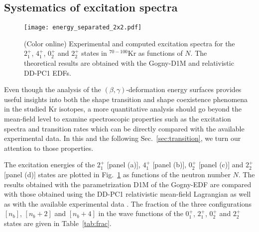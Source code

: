 \documentclass[twocolumn,showpacs,amsmath,amssymb,superscriptaddress]{revtex4-1}
\begin{document}
\subsection{Systematics of excitation spectra\label{sec:energy}}


\begin{figure}[htb!]
\begin{center}
\texttt{[image: energy\_separated\_2x2.pdf]}
\caption{(Color online) Experimental
 \cite{data,albers2013,rzkacaurban2017,dudouet2017,flavigny2017} and computed excitation
 spectra for 
 the $2^+_1$, $4^+_1$, $0^+_2$ and $2^+_2$ states in  $^{70-100}$Kr
 as functions of $N$. The theoretical results are obtained with the Gogny-D1M and
 relativistic DD-PC1 EDFs.}
\label{fig:energy}
\end{center}
\end{figure}


Even though the analysis of the $(\beta,\gamma)$-deformation energy
surfaces provides useful insights into both the shape transition
and shape coexistence phenomena in the studied Kr isotopes, a more 
quantitative analysis should go beyond 
the mean-field level to examine  spectroscopic 
properties such as the  excitation spectra and transition rates which 
can be directly compared with the available 
experimental data. In this and the following Sec.~\ref{sec:transition}, we turn our 
attention to those properties.


The excitation energies of the 
$2^+_1$ [panel (a)], $4^+_1$ [panel (b)], $0^+_2$ [panel (c)] and
$2^+_2$ [panel (d)] states
are plotted in Fig.~\ref{fig:energy} as functions of the neutron number $N$.
The results obtained with the parametrization D1M of the Gogny-EDF
are compared with those obtained using the 
DD-PC1 relativistic mean-field Lagrangian as well as with the available
experimental data \cite{data,albers2013,rzkacaurban2017,dudouet2017,flavigny2017}. The  
fraction of the three
configurations $[n_b]$, $[n_b+2]$ and $[n_b+4]$ 
in the wave functions of the $0^+_1$, $2^+_1$, $0^+_2$
and $2^+_2$ states are given in Table~\ref{tab:frac}.
 
\end{document}
